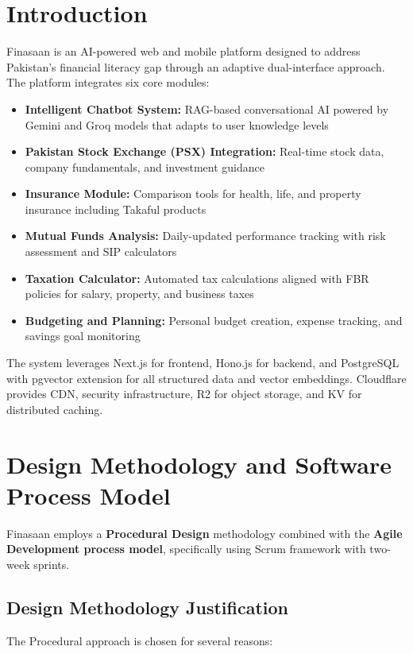 \documentclass[12pt,a4paper]{report}
\begin{document}
\chapter{Introduction}

Finasaan is an AI-powered web and mobile platform designed to address Pakistan's financial literacy gap through an adaptive dual-interface approach. The platform integrates six core modules:

\begin{itemize}
    \item \textbf{Intelligent Chatbot System:} RAG-based conversational AI powered by Gemini and Groq models that adapts to user knowledge levels
    \item \textbf{Pakistan Stock Exchange (PSX) Integration:} Real-time stock data, company fundamentals, and investment guidance
    \item \textbf{Insurance Module:} Comparison tools for health, life, and property insurance including Takaful products
    \item \textbf{Mutual Funds Analysis:} Daily-updated performance tracking with risk assessment and SIP calculators
    \item \textbf{Taxation Calculator:} Automated tax calculations aligned with FBR policies for salary, property, and business taxes
    \item \textbf{Budgeting and Planning:} Personal budget creation, expense tracking, and savings goal monitoring
\end{itemize}

The system leverages Next.js for frontend, Hono.js for backend, and PostgreSQL with pgvector extension for all structured data and vector embeddings. Cloudflare provides CDN, security infrastructure, R2 for object storage, and KV for distributed caching.

\chapter{Design Methodology and Software Process Model}

Finasaan employs a \textbf{Procedural Design} methodology combined with the \textbf{Agile Development process model}, specifically using Scrum framework with two-week sprints.

\section{Design Methodology Justification}
The Procedural approach is chosen for several reasons:
\end{document}
